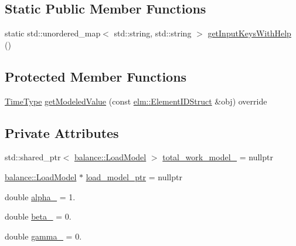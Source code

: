 \subsection*{Static Public Member Functions}
\begin{DoxyCompactItemize}
\item 
static std\+::unordered\+\_\+map$<$ std\+::string, std\+::string $>$ \hyperlink{structvt_1_1vrt_1_1collection_1_1lb_1_1_tempered_w_min_a30e2c27a7d127db53f268916fe8cbee2}{get\+Input\+Keys\+With\+Help} ()
\end{DoxyCompactItemize}
\subsection*{Protected Member Functions}
\begin{DoxyCompactItemize}
\item 
\hyperlink{namespacevt_a876a9d0cd5a952859c72de8a46881442}{Time\+Type} \hyperlink{structvt_1_1vrt_1_1collection_1_1lb_1_1_tempered_w_min_a80d9e3a0dd25bbe3183bd3d3f54c6af2}{get\+Modeled\+Value} (const \hyperlink{structvt_1_1elm_1_1_element_i_d_struct}{elm\+::\+Element\+I\+D\+Struct} \&obj) override
\end{DoxyCompactItemize}
\subsection*{Private Attributes}
\begin{DoxyCompactItemize}
\item 
std\+::shared\+\_\+ptr$<$ \hyperlink{structvt_1_1vrt_1_1collection_1_1balance_1_1_load_model}{balance\+::\+Load\+Model} $>$ \hyperlink{structvt_1_1vrt_1_1collection_1_1lb_1_1_tempered_w_min_a823e9f6adf5517ee65be8e32ca50b139}{total\+\_\+work\+\_\+model\+\_\+} = nullptr
\item 
\hyperlink{structvt_1_1vrt_1_1collection_1_1balance_1_1_load_model}{balance\+::\+Load\+Model} $\ast$ \hyperlink{structvt_1_1vrt_1_1collection_1_1lb_1_1_tempered_w_min_a02400fd847cdebdf68d733e166b34cfd}{load\+\_\+model\+\_\+ptr} = nullptr
\item 
double \hyperlink{structvt_1_1vrt_1_1collection_1_1lb_1_1_tempered_w_min_a3c73a78b96830428d3f87b5f930ebef5}{alpha\+\_\+} = 1.
\item 
double \hyperlink{structvt_1_1vrt_1_1collection_1_1lb_1_1_tempered_w_min_abce8c16e0a7656a9df933f54ce7d2256}{beta\+\_\+} = 0.
\item 
double \hyperlink{structvt_1_1vrt_1_1collection_1_1lb_1_1_tempered_w_min_abfdd0a558d47f9e31f8645fc703479db}{gamma\+\_\+} = 0.
\end{DoxyCompactItemize}
